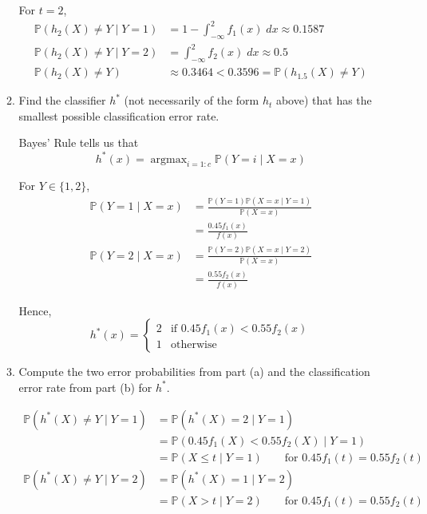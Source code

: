 \documentclass[11pt]{report}
\DeclareMathOperator{\argmax}{\arg\max}
\renewcommand{\P}{\mathbb{P}}
\begin{document}
\begin{enumerate}[1.]
\begin{enumerate}
		            \color{blue}
		            For $\boxed{t = 2}$,
		            \begin{align*}
			            \P(h_2(X) \neq Y \; | \; Y = 1) & = 1 - \int_{-\infty}^2 f_1(x) \; dx \approx \boxed{0.1587} \\
			            \P(h_2(X) \neq Y \; | \; Y = 2) & = \int_{-\infty}^2 f_2(x) \; dx \approx \boxed{0.5}        \\
			            \P(h_2(X) \neq Y)               & \approx \boxed{0.3464} < 0.3596 = \P(h_{1.5}(X) \neq Y)
		            \end{align*}
		            \color{black}

		      \item Find the classifier $h^*$ (not necessarily of the form $h_t$ above) that has the smallest possible classification error rate.

		            \color{blue}
		            Bayes' Rule tells us that
		            \[h^*(x) = \argmax_{i=1:c} \P(Y = i \; | \; X = x)\]

		            For $Y \in \{1, 2\}$,
		            \begin{align*}
			            \P(Y = 1 \; | \; X = x) & = \frac{\P(Y = 1) \P(X = x \; | \; Y= 1)}{\P(X = x)} \\
			                                    & = \frac{0.45 f_1(x)}{f(x)}                           \\
			            \P(Y = 2 \; | \; X = x) & = \frac{\P(Y = 2) \P(X = x \; | \; Y= 2)}{\P(X = x)} \\
			                                    & = \frac{0.55 f_2(x)}{f(x)}
		            \end{align*}

		            Hence,
		            \[h^*(x) = \begin{cases}
				            2 & \text{if } 0.45 f_1(x) < 0.55 f_2(x) \\
				            1 & \text{otherwise}
			            \end{cases}\]
		            \color{black}

		      \item Compute the two error probabilities from part (a) and the classification error rate from part (b) for $h^*$.

		            \color{blue}
		            \begin{align*}
			            \P(h^*(X) \neq Y \; | \; Y = 1) & = \P(h^*(X) = 2 \; | \; Y = 1)                                         \\
			                                            & = \P(0.45 f_1(X) < 0.55 f_2(X) \; | \; Y = 1)                          \\
			                                            & = \P(X \leq t \; | \; Y= 1) \qquad \text{for } 0.45f_1(t) = 0.55f_2(t) \\
			            \P(h^*(X) \neq Y \; | \; Y = 2) & = \P(h^*(X) = 1 \; | \; Y = 2)                                         \\
			                                            & = \P(X > t \; | \; Y = 2) \qquad \text{for } 0.45 f_1(t) = 0.55f_2(t)
		            \end{align*}


\end{enumerate}
\end{enumerate}
\end{document}
